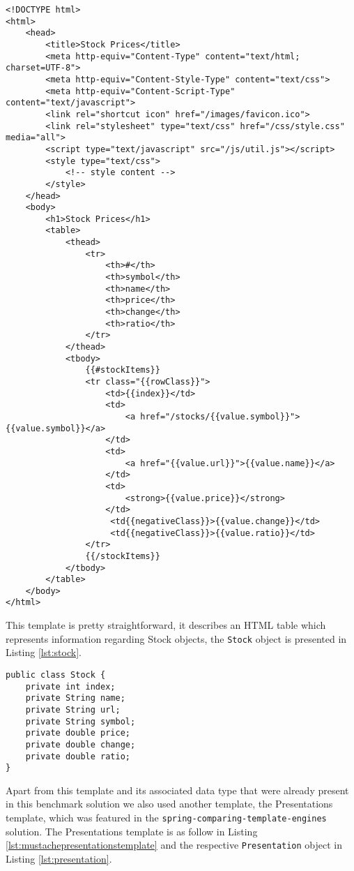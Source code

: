 \begin{lstlisting}[caption={Stocks Template Defined in the Mustache Idiom},captionpos=b,label={lst:mustachestockstemplate}]
<!DOCTYPE html>
<html>
	<head>
		<title>Stock Prices</title>
		<meta http-equiv="Content-Type" content="text/html; charset=UTF-8">
		<meta http-equiv="Content-Style-Type" content="text/css">
		<meta http-equiv="Content-Script-Type" content="text/javascript">
		<link rel="shortcut icon" href="/images/favicon.ico">
		<link rel="stylesheet" type="text/css" href="/css/style.css" media="all">
		<script type="text/javascript" src="/js/util.js"></script>
		<style type="text/css">
			<!-- style content -->
		</style>
	</head>
	<body>
		<h1>Stock Prices</h1>
		<table>
			<thead>
	    		<tr>
	     			<th>#</th>
	     			<th>symbol</th>
	     			<th>name</th>
	     			<th>price</th>
	     			<th>change</th>
	     			<th>ratio</th>
	    		</tr>
	   		</thead>
	   		<tbody>
				{{#stockItems}}
	    		<tr class="{{rowClass}}">
	     			<td>{{index}}</td>
	    			<td>
	      				<a href="/stocks/{{value.symbol}}">{{value.symbol}}</a>
	     			</td>
	     			<td>
	      				<a href="{{value.url}}">{{value.name}}</a>
	     			</td>
	     			<td>
	      				<strong>{{value.price}}</strong>
	     			</td>
				     <td{{negativeClass}}>{{value.change}}</td>
				     <td{{negativeClass}}>{{value.ratio}}</td>
	    		</tr>
				{{/stockItems}}
	   		</tbody>
		</table>
	</body>
</html>
\end{lstlisting}

\noindent
This template is pretty straightforward, it describes an \ac{HTML} table which represents information regarding Stock objects, the \texttt{Stock} object is presented in Listing \ref{lst:stock}.

\bigskip


\begin{minipage}{\linewidth}
\begin{lstlisting}[caption={Stocks Data Type},captionpos=b,label={lst:stock}]
public class Stock {
    private int index;
    private String name;
    private String url;
    private String symbol;
    private double price;
    private double change;
    private double ratio;    
}
\end{lstlisting}
\end{minipage}

\noindent
Apart from this template and its associated data type that were already present in this benchmark solution we also used another template, the Presentations template, which was featured in the \texttt{spring-comparing-template-engines} solution. The Presentations template is as follow in Listing \ref{lst:mustachepresentationstemplate} and the respective \texttt{Presentation} object in Listing \ref{lst:presentation}.


